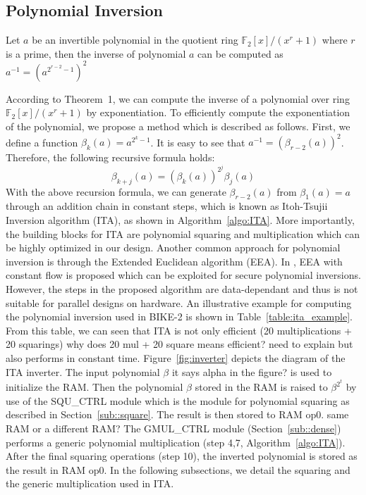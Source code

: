 \documentclass[runningheads]{llncs}
\begin{document}
\subsection{Polynomial Inversion}
\label{sub::inversion}
\begin{theorem}
Let $a$ be an invertible polynomial in the quotient ring $\mathbb{F}_2[x]/(x^r+1)$ where $r$ is a prime, then the inverse of polynomial $a$ can be computed as $a^{-1}=(a^{2^{r-2}-1})^2$
\end{theorem}
%
According to Theorem~1, we can compute the inverse of a 
polynomial over ring $\mathbb{F}_2[x]/(x^r+1)$
by exponentiation. 
To efficiently compute the exponentiation of the polynomial,
we propose a method which is described as follows. 
First, we define a function $\beta_{k}(a)=a^{2^k-1}$. 
It is easy to see that $a^{-1}=(\beta_{r-2}(a))^2$. %
Therefore, the following recursive
formula holds:
\[
    \beta_{k+j}(a)=(\beta_{k}(a))^{2^j}\beta_{j}(a)
\]
%
With the above recursion formula, we can generate $\beta_{r-2}(a)$ from $\beta_{1}(a)=a$ 
through an addition chain in constant steps, which is known as 
Itoh-Tsujii Inversion algorithm (ITA), as shown in Algorithm~\ref{algo:ITA}. 
More importantly, the building blocks for ITA are 
polynomial squaring and multiplication which 
can be highly optimized in our design. 
Another common approach for polynomial inversion 
is through the Extended Euclidean algorithm (EEA). 
In \cite{georgieva2015toward}, EEA with constant flow is 
proposed which can be exploited for secure polynomial inversions. 
However, the steps in the proposed algorithm are data-dependant 
and thus is not suitable for parallel designs on hardware. 
An illustrative example for computing the polynomial inversion used in 
BIKE-2 is shown in Table~\ref{table:ita_example}. 
From this table, we can seen that ITA is not only efficient 
(20 multiplications + 20 squarings) 
{\color{red} why does 20 mul + 20 square means efficient?
need to explain}
but also performs in constant time. 
Figure~\ref{fig:inverter} depicts the diagram of the ITA inverter. 
The input polynomial $\beta$ 
{\color{red} it says alpha in the figure?}
is used to initialize the RAM. 
Then the polynomial $\beta$ stored in the RAM is raised 
to ${\beta}^{2^t}$ by use of the SQU\_CTRL module which 
is the module for polynomial squaring as described
in Section~\ref{sub::square}. 
The result is then stored to RAM op0. 
{\color{red} same RAM or a different RAM?}
The GMUL\_CTRL module (Section~\ref{sub::dense}) performs a 
generic polynomial multiplication 
(step 4,7, Algorithm~\ref{algo:ITA}). 
After the final squaring operations (step 10), 
the inverted polynomial is stored as the result in RAM op0. 
In the following subsections, 
we detail the squaring and the generic multiplication used in ITA.
\end{document}
